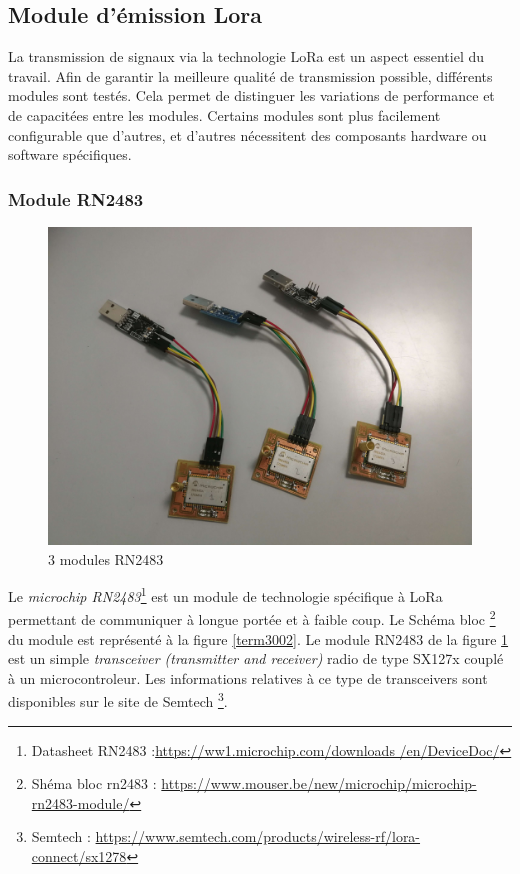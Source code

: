\subsection{Module d'émission Lora}

La transmission de signaux via la technologie LoRa est un aspect essentiel du travail. Afin de garantir la meilleure qualité de transmission possible, différents modules sont testés. Cela permet de distinguer les variations de performance et de capacitées entre les modules. Certains modules sont plus facilement configurable que d'autres, et d'autres nécessitent des composants hardware ou software spécifiques.

\subsubsection{Module RN2483}

\begin{figure}[h]
\centering

\includegraphics[scale=0.08]{images/rn2483.png}
\caption{3 modules RN2483}\label{term34}
\end{figure}


Le \textit{microchip RN2483}\footnote{Datasheet RN2483 :\href{https://ww1.microchip.com/downloads/en/DeviceDoc/40001784B.pdf}{https://ww1.microchip.com/downloads
/en/DeviceDoc/}} est un module de technologie spécifique à LoRa permettant de communiquer à longue portée et à faible coup. Le Schéma bloc \footnote{Shéma bloc rn2483 : \href{https://www.mouser.be/new/microchip/microchip-rn2483-module/}{https://www.mouser.be/new/microchip/microchip-rn2483-module/}} du module est représenté à la figure \ref{term3002}. Le module RN2483 de la figure \ref{term34} est un simple \textit{transceiver (transmitter and receiver)} radio de type SX127x couplé à un microcontroleur. Les informations relatives à ce type de transceivers sont disponibles sur le site de Semtech \footnote{Semtech : \href{https://www.semtech.com/products/wireless-rf/lora-connect/sx1278}{https://www.semtech.com/products/wireless-rf/lora-connect/sx1278}}.


